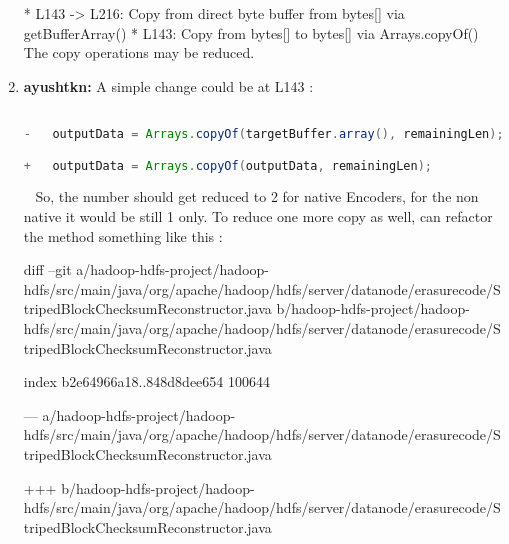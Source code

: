 \documentclass{report}%
\begin{document}
\begin{enumerate}
\newline%
 * L143 {-}> L216: Copy from direct byte buffer from bytes{[}{]} via getBufferArray()\newline%
\newline%
 * L143: Copy from bytes{[}{]} to bytes{[}{]} via Arrays.copyOf()\newline%
\newline%
\newline%
\newline%
The copy operations may be reduced.%
\item%
\textbf{ayushtkn: }A simple change could be at L143 :\newline%
\newline%
\begin{lstlisting}[language=java]

-   outputData = Arrays.copyOf(targetBuffer.array(), remainingLen);

+   outputData = Arrays.copyOf(outputData, remainingLen);

\end{lstlisting} \ \newline%
\newline%
So, the number should get reduced to 2 for native Encoders, for the non native it would be still 1 only.\newline%
\newline%
\newline%
\newline%
To reduce one more copy as well, can refactor the method something like this :\newline%
\newline%
\newline%
\newline%
\newline%
\newline%
\begin{spverbatim}

diff --git a/hadoop-hdfs-project/hadoop-hdfs/src/main/java/org/apache/hadoop/hdfs/server/datanode/erasurecode/StripedBlockChecksumReconstructor.java b/hadoop-hdfs-project/hadoop-hdfs/src/main/java/org/apache/hadoop/hdfs/server/datanode/erasurecode/StripedBlockChecksumReconstructor.java

index b2e64966a18..848d8dee654 100644

--- a/hadoop-hdfs-project/hadoop-hdfs/src/main/java/org/apache/hadoop/hdfs/server/datanode/erasurecode/StripedBlockChecksumReconstructor.java

+++ b/hadoop-hdfs-project/hadoop-hdfs/src/main/java/org/apache/hadoop/hdfs/server/datanode/erasurecode/StripedBlockChecksumReconstructor.java


\end{spverbatim}
\end{enumerate}
\end{document}
